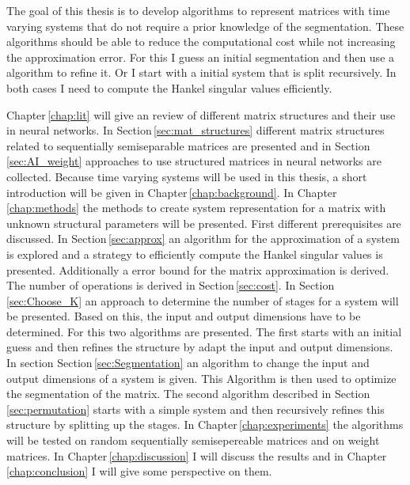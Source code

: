 \documentclass[doctype=mastersthesis,BCOR=15mm,biblatex]{ldvbook}%
\begin{document}
The goal of this thesis is to develop algorithms to represent matrices with time varying systems that do not require a prior knowledge of the segmentation.
These algorithms should be able to reduce the computational cost while not increasing the approximation error.
For this I guess an initial segmentation and then use a algorithm to refine it.
Or I start with a initial system that is split recursively.
In both cases I need to compute the Hankel singular values efficiently.


Chapter\,\ref{chap:lit} will give an review of different matrix structures and their use in neural networks.
In Section\,\ref{sec:mat_structures} different matrix structures related to sequentially semiseparable matrices are presented
and in Section\,\ref{sec:AI_weight} approaches to use structured matrices in neural networks are collected.
Because time varying systems will be used in this thesis, a short introduction will be given in Chapter\,\ref{chap:background}.
In Chapter\,\ref{chap:methods} the methods to create system representation for a matrix with unknown structural parameters will be presented.
First different prerequisites are discussed.
In Section\,\ref{sec:approx} an algorithm for the approximation of a system is explored
and a strategy to efficiently compute the Hankel singular values is presented.
Additionally a error bound for the matrix approximation is derived.
The number of operations is derived in Section\,\ref{sec:cost}.
In Section\,\ref{sec:Choose_K} an approach to determine the number of stages for a system will be presented.
Based on this, the input and output dimensions have to be determined.
For this two algorithms are presented.
The first starts with an initial guess and then refines the structure by adapt the input and output dimensions.
In section Section\,\ref{sec:Segmentation} an algorithm to change the input and output dimensions of a system is given.
This Algorithm is then used to optimize the segmentation of the matrix.
The second algorithm described in Section\,\ref{sec:permutation} starts with a simple system and then recursively refines this structure by splitting up the stages.
In Chapter\,\ref{chap:experiments} the algorithms will be tested on random sequentially semisepereable matrices and on weight matrices.
In Chapter\,\ref{chap:discussion} I will discuss the results and in Chapter\,\ref{chap:conclusion} I will give some perspective on them.
\end{document}
